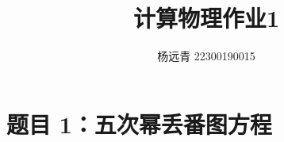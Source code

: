 \documentclass[11pt]{article}
\author{杨远青 22300190015}
\title{计算物理作业1}
\begin{document}
\maketitle

\section{题目 1：五次幂丢番图方程}

\end{document}
